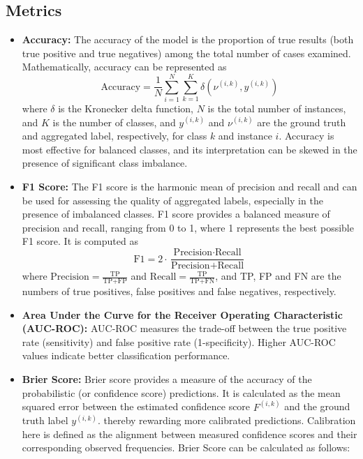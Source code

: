 \documentclass[sn-nature]{bst/sn-jnl}
\begin{document}
\subsection{Metrics}
\begin{itemize}
    \item \textbf{Accuracy:} The accuracy of the model is the proportion of true results (both true positive and true negatives) among the total number of cases examined. Mathematically, accuracy can be represented as
    \begin{equation}
        \text{Accuracy}= \frac{1}{N} \sum_{i=1}^{N} \sum_{k=1}^{K} \delta\left(\nu^{(i,k)}, y^{(i,k)}\right)
    \end{equation}
    where $\delta$ is the Kronecker delta function, $N$ is the total number of instances, and $K$ is the number of classes, and $y^{(i,k)}$ and $\nu^{(i,k)}$ are the ground truth and aggregated label, respectively, for class $k$ and instance $i$. Accuracy is most effective for balanced classes, and its interpretation can be skewed in the presence of significant class imbalance.
    \item \textbf{F1 Score:} The F1 score is the harmonic mean of precision and recall and can be used for assessing the quality of aggregated labels, especially in the presence of imbalanced classes. F1 score provides a balanced measure of precision and recall, ranging from 0 to 1, where 1 represents the best possible F1 score. It is computed as
    \begin{equation}
        \text{F1} = 2 \cdot \frac{\text{Precision} \cdot \text{Recall}}{\text{Precision} + \text{Recall}}
    \end{equation}
    where $\text{Precision} = \frac{\text{TP}}{\text{TP+FP}}$ and $\text{Recall} = \frac{\text{TP}}{\text{TP+FN}}$, and TP, FP and FN are the numbers of true positives, false positives and false negatives, respectively.
    \item \textbf{Area Under the Curve for the Receiver Operating Characteristic (AUC-ROC):} AUC-ROC measures the trade-off between the true positive rate (sensitivity) and false positive rate (1-specificity). Higher AUC-ROC values indicate better classification performance.
    \item \textbf{Brier Score:} Brier score provides a measure of the accuracy of the probabilistic (or confidence score) predictions. It is calculated as the mean squared error between the estimated confidence score $F^{(i,k)}$ and the ground truth label $y^{(i,k)}$. thereby rewarding more calibrated predictions. Calibration here is defined as the alignment between measured confidence scores and their corresponding observed frequencies. Brier Score can be calculated as follows:

\end{itemize}
\end{document}
